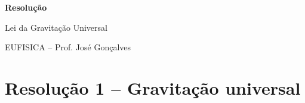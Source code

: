 \documentclass[11pt,a4paper]{article}
\newif\ifsolucoes
\begin{document}
	
	\ifsolucoes
	
	\clearpage
	
	\begin{center}
		
		{\Huge\bfseries\textcolor{eufgreen!70!black}{Resolução}}
		
		\vspace{2mm}
		
		{\large Lei da Gravitação Universal}
		
		\vspace{1mm}
		
		{\small EUFISICA -- Prof. José Gonçalves}
		
	\end{center}
	
	\vspace{4mm}
	
	\section*{Resolução 1 -- Gravitação universal}
	
\end{document}
